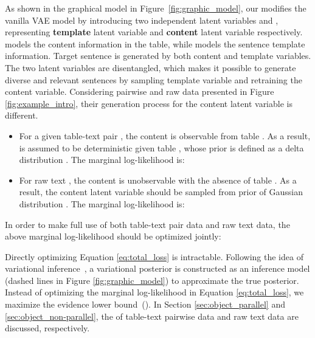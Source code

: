 

As shown in the graphical model in Figure~\ref{fig:graphic_model}, our \method modifies the vanilla VAE model by introducing two independent latent variables  and , representing \textbf{template} latent variable and \textbf{content} latent variable respectively.  models the content information in the table, while  models the sentence template information. Target sentence  is generated by both content and template variables. The two latent variables are disentangled, which makes it possible to generate diverse and relevant sentences by sampling template variable and retraining the content variable.
Considering pairwise and raw data presented in Figure \ref{fig:example_intro}, their generation process for the content latent variable  is different. 


\begin{itemize}[leftmargin=2em, topsep=0pt]
    \item For a given table-text pair , the content is observable from table . As a result,  is assumed to be deterministic given table , whose prior is defined as a delta distribution . The marginal log-likelihood is:
    
    \item For raw text , the content is unobservable with the absence of table . As a result, the content latent variable  should be sampled from prior of Gaussian distribution . The marginal log-likelihood is:
    

\end{itemize}






















In order to make full use of both table-text pair data and raw text data, the above marginal log-likelihood should be optimized jointly:


Directly optimizing Equation \ref{eq:total_loss} is intractable. 
Following the idea of variational inference~\citep{kingma2013auto}, a variational posterior  is constructed as an inference model (dashed lines in Figure \ref{fig:graphic_model}) to approximate the true posterior. Instead of optimizing the marginal log-likelihood in Equation \ref{eq:total_loss}, we maximize the evidence lower bound~(). In Section \ref{sec:object_parallel} and \ref{sec:object_non-parallel}, the  of table-text pairwise data and raw text data are discussed, respectively.



